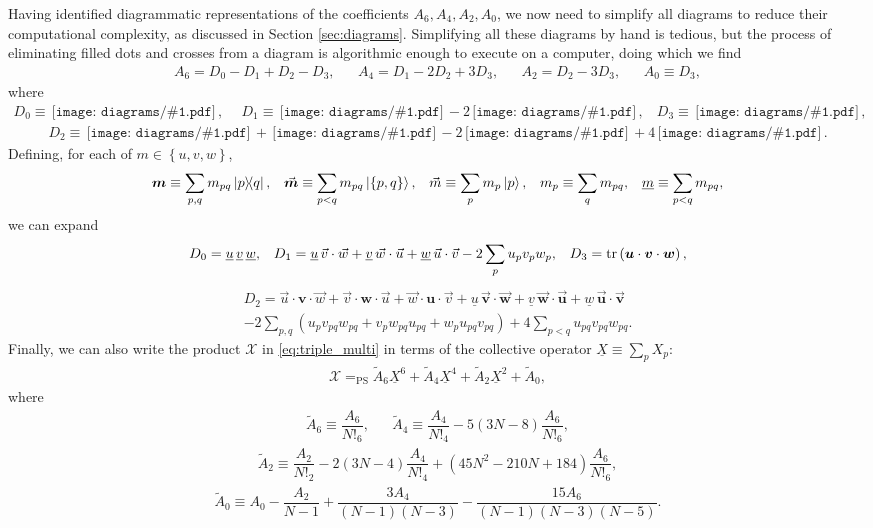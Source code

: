 \documentclass[nofootinbib,notitlepage,11pt]{revtex4-2}
\newcommand{\f}[2]{\dfrac{#1}{#2}} %
\newcommand{\p}[1]{\left(#1\right)} %
\renewcommand{\set}[1]{\left\{#1\right\}} %
\renewcommand{\c}{\cdot} %
\newcommand{\m}{\bm} %
\renewcommand{\v}{\vec} %
\newcommand{\1}{\mathds{1}}
\newcommand{\X}{\mathcal{X}}
\newcommand{\EQPS}{=_{\text{PS}}}
\newcommand{\col}{\underline}
\newcommand{\diagram}[1]
{\,\texttt{[image: diagrams/\#1.pdf]}\,}
\begin{document}
Having identified diagrammatic representations of the coefficients
$A_6,A_4,A_2,A_0$, we now need to simplify all diagrams to reduce
their computational complexity, as discussed in Section
\ref{sec:diagrams}.  Simplifying all these diagrams by hand is
tedious, but the process of eliminating filled dots and crosses from a
diagram is algorithmic enough to execute on a computer, doing which we
find
\begin{align}
  A_6 = D_0 - D_1 + D_2 - D_3,
  &&
  A_4 = D_1 - 2 D_2 + 3 D_3,
  &&
  A_2 = D_2 - 3 D_3,
  &&
  A_0 \equiv D_3,
\end{align}
where
\begin{align}
  D_0 \equiv \diagram{triple_0_o},
  &&
  D_1 \equiv \diagram{triple_01_o} - 2 \diagram{triple_1_o},
  &&
  D_3 \equiv \diagram{triple_0111_o},
\end{align}
\begin{align}
  D_2 \equiv \diagram{triple_011_o}
  + \diagram{triple_02_o}
  - 2 \diagram{triple_11_o}
  + 4 \diagram{triple_2_o}.
\end{align}
Defining, for each of $m\in\set{u,v,w}$,
\begin{align}
  \m m \equiv \sum_{p,q} m_{pq} \op{p}{q},
  &&
  \v{\m m} \equiv \sum_{p<q} m_{pq} \ket{\set{p,q}},
  &&
  \v m \equiv \sum_p m_p \ket{p},
  &&
  m_p \equiv \sum_q m_{pq},
  &&
  \col{m} \equiv \sum_{p<q} m_{pq},
\end{align}
we can expand
\begin{align}
  D_0 = \col{u}\,\col{v}\,\col{w},
  &&
  D_1 = \col{u}\,\v v\c\v w + \col{v}\,\v w\c\v u
  + \col{w}\,\v u\c\v v - 2 \sum_p u_p v_p w_p,
  &&
  D_3 = \tr\p{\m u \c \m v \c \m w},
\end{align}
\begin{multline}
  D_2 = \v u \c\m v\c\v w + \v v \c\m w\c\v u + \v w \c\m u\c\v v
  + \col{u}\,\v{\m v}\c\v{\m w} + \col{v}\,\v{\m w}\c\v{\m u}
  + \col{w}\,\v{\m u}\c\v{\m v} \\
  - 2 \sum_{p,q} \p{u_p v_{pq} w_{pq}
    + v_p w_{pq} u_{pq} + w_p u_{pq} v_{pq}}
  + 4 \sum_{p<q} u_{pq} v_{pq} w_{pq}.
\end{multline}
Finally, we can also write the product $\X$ in \eqref{eq:triple_multi}
in terms of the collective operator $\col{X} \equiv \sum_p X_p$:
\begin{align}
  \X \EQPS
  \tilde A_6 \col{X}^6 + \tilde A_4 \col{X}^4
  + \tilde A_2 \col{X}^2 + \tilde A_0,
  \label{eq:triple_col}
\end{align}
where
\begin{align}
  \tilde A_6 \equiv \f{A_6}{N!_6},
  &&
  \tilde A_4 \equiv \f{A_4}{N!_4} - 5\p{3N-8} \f{A_6}{N!_6},
\end{align}
\begin{align}
  \tilde A_2 \equiv \f{A_2}{N!_2} - 2\p{3N-4} \f{A_4}{N!_4}
  + \p{45N^2-210N+184} \f{A_6}{N!_6},
\end{align}
\begin{align}
  \tilde A_0 \equiv A_0 - \f{A_2}{N-1}
  + \f{3A_4}{\p{N-1}\p{N-3}}
  - \f{15A_6}{\p{N-1}\p{N-3}\p{N-5}}.
\end{align}
\end{document}
